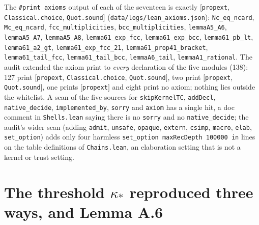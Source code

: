 \documentclass[11pt]{article}
\newcommand{\lean}[1]{\texttt{#1}}
\newcommand{\ks}{\kappa_*}
\begin{document}
The \lean{\#print axioms} output of each of the seventeen is exactly $[$\lean{propext}, \lean{Classical.choice}, \lean{Quot.sound}$]$
(\texttt{data/logs/lean\_axioms.json}): \lean{Nc\_eq\_ncard}, \lean{Mc\_eq\_ncard}, \lean{fcc\_multiplicities}, \lean{bcc\_multiplicities}, \lean{lemmaA5\_A6}, \lean{lemmaA5\_A7}, \lean{lemmaA5\_A8},
\lean{lemma61\_exp\_fcc}, \lean{lemma61\_exp\_bcc}, \lean{lemma61\_pb\_lt}, \lean{lemma61\_a2\_gt}, \lean{lemma61\_exp\_fcc\_21}, \lean{lemma61\_prop41\_bracket}, \lean{lemma61\_tail\_fcc}, \lean{lemma61\_tail\_bcc}, \lean{lemmaA6\_tail}, \lean{lemmaA1\_rational}.
The audit extended the axiom print to \emph{every} declaration of the five modules (138): 127 print $[$\lean{propext}, \lean{Classical.choice}, \lean{Quot.sound}$]$, two print $[$\lean{propext}, \lean{Quot.sound}$]$, one prints $[$\lean{propext}$]$ and eight print no axiom; nothing lies outside the whitelist.
A scan of the five sources for \lean{skipKernelTC}, \lean{addDecl}, \lean{native\_decide}, \lean{implemented\_by}, \lean{sorry} and \lean{axiom} has a single hit, a doc comment in \texttt{Shells.lean} saying there is no \lean{sorry} and no \lean{native\_decide}; the audit's wider scan (adding \lean{admit}, \lean{unsafe}, \lean{opaque}, \lean{extern}, \lean{csimp}, \lean{macro}, \lean{elab}, \lean{set\_option}) adds only four harmless \lean{set\_option maxRecDepth 100000 in} lines on the table definitions of \texttt{Chains.lean}, an elaboration setting that is not a kernel or trust setting.

\section{The threshold \texorpdfstring{$\ks$}{kappa*} reproduced three ways, and Lemma A.6}\label{sec:kappa}
\end{document}
